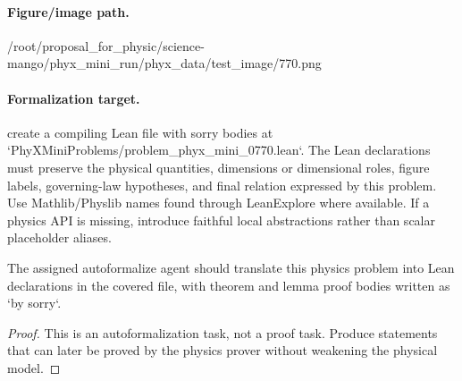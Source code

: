 \paragraph{Figure/image path.}
/root/proposal\_for\_physic/science-mango/phyx\_mini\_run/phyx\_data/test\_image/770.png

\paragraph{Formalization target.}
create a compiling Lean file with sorry bodies at `PhyXMiniProblems/problem\_phyx\_mini\_0770.lean`. The Lean declarations must preserve the physical quantities, dimensions or dimensional roles, figure labels, governing-law hypotheses, and final relation expressed by this problem.
Use Mathlib/Physlib names found through LeanExplore where available. If a physics API is missing, introduce faithful local abstractions rather than scalar placeholder aliases.

\begin{theorem}
\label{thm:physics:phyx_mini_0770:target}
The assigned autoformalize agent should translate this physics problem into Lean declarations in the covered file, with theorem and lemma proof bodies written as `by sorry`.
\end{theorem}
\begin{proof}
This is an autoformalization task, not a proof task. Produce statements that can later be proved by the physics prover without weakening the physical model.
\end{proof}

